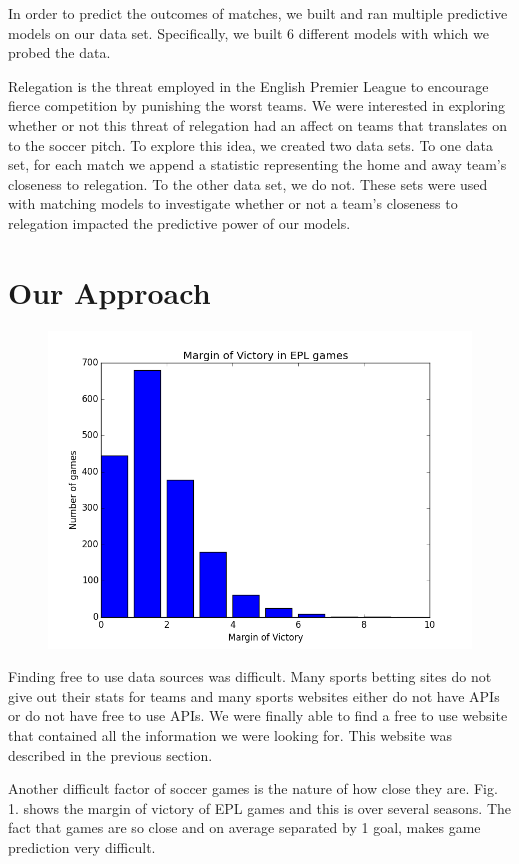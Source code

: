 \documentclass[conference]{IEEEtran}
\begin{document}
In order to predict the outcomes of matches, we built and ran multiple predictive   models on our data set. Specifically, we built 6 different models with which we probed  the data. 

Relegation is the threat employed in the English Premier League to encourage fierce    competition by punishing the worst teams.  We were interested in exploring whether or   not this threat of relegation had an affect on teams that translates on to the soccer   pitch. To explore this idea, we created two data sets. To one data set, for each match  we append a statistic representing the home and away team's closeness to relegation. To the other data set, we do not. These sets were used with matching models to investigate whether or not a team's closeness to relegation impacted the predictive power of our    models.
\section{Our Approach}
\begin{figure}[b]
\centering
\includegraphics[width=0.7\linewidth]{MarginOfVictory}
\caption{}
\label{fig:MarginOfVictory}
\end{figure}


Finding free to use data sources was difficult. Many sports betting sites do not give out their stats for teams and many sports websites either do not have APIs or do not have free to use APIs. We were finally able to find a free to use website that contained all the information we were looking for. This website was described in the previous section.

Another difficult factor of soccer games is the nature of how close they are. Fig. 1. shows the margin of victory of EPL games and this is over several seasons. The fact that games are so close and on average separated by 1 goal, makes game prediction very difficult.
\end{document}
